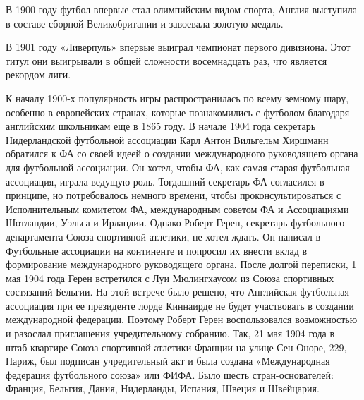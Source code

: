 


В 1900 году футбол впервые стал олимпийским видом спорта, Англия выступила в составе сборной Великобритании и завоевала золотую медаль.

В 1901 году «Ливерпуль» впервые выиграл чемпионат первого дивизиона. Этот титул они выигрывали в общей сложности восемнадцать раз, что является рекордом лиги.

К началу 1900-х популярность игры распространилась по всему земному шару, особенно в европейских странах, которые познакомились с футболом благодаря английским школьникам еще в 1865 году. В начале 1904 года секретарь Нидерландской футбольной ассоциации Карл Антон Вильгельм Хиршманн обратился к ФА со своей идеей о создании международного руководящего органа для футбольной ассоциации. Он хотел, чтобы ФА, как самая старая футбольная ассоциация, играла ведущую роль. Тогдашний секретарь ФА согласился в принципе, но потребовалось немного времени, чтобы проконсультироваться с Исполнительным комитетом ФА, международным советом ФА и Ассоциациями Шотландии, Уэльса и Ирландии. Однако Роберт Герен, секретарь футбольного департамента Союза спортивной атлетики, не хотел ждать. Он написал в Футбольные ассоциации на континенте и попросил их внести вклад в формирование международного руководящего органа. После долгой переписки, 1 мая 1904 года Герен встретился с Луи Мюлингхаусом из Союза спортивных состязаний Бельгии. На этой встрече было решено, что Английская футбольная ассоциация при ее президенте лорде Киннаирде не будет участвовать в создании международной федерации. Поэтому Роберт Герен воспользовался возможностью и разослал приглашения учредительному собранию. Так, 21 мая 1904 года в штаб-квартире Союза спортивной атлетики Франции на улице Сен-Оноре, 229, Париж, был подписан учредительный акт и была создана «Международная федерация футбольного союза» или ФИФА. Было шесть стран-основателей: Франция, Бельгия, Дания, Нидерланды, Испания, Швеция и Швейцария.

